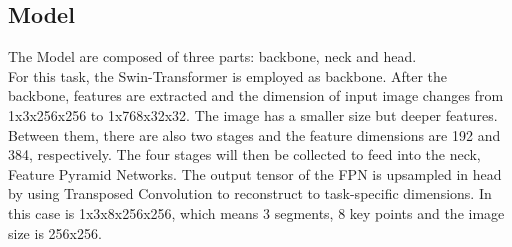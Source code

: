 \subsection{Model}
The Model are composed of three parts: backbone, neck and head.\\
For this task, the Swin-Transformer is employed as backbone. After the backbone, features are extracted and the dimension of input image changes 
from 1x3x256x256 to 1x768x32x32. The image has a smaller size but deeper features.
Between them, there are also two stages and the feature dimensions are 192 and 384, respectively. 
The four stages will then be collected to feed into the neck, Feature Pyramid Networks. The output tensor of the FPN is upsampled in head by using
Transposed Convolution to reconstruct to task-specific dimensions.
In this case is 1x3x8x256x256, which means 3 segments, 8 key points and the image size is 256x256.
